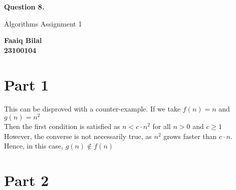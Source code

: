 \documentclass[]{article}
\begin{document}
\begin{center}
    \vspace*{1cm}

    \textbf{Question 8.}

    \vspace{0.5cm}
     Algorithms Assignment 1

    \vspace{0.15cm}

    \textbf{Faaiq Bilal} \\ 
    \textbf{23100104}
         
\end{center}

\section{Part 1}
This can be disproved with a counter-example. If we take $ f(n) = n$ and $ g(n) = n^2$ \\ 
Then the first condition is satisfied as $ n < c \cdot n^2 $ for all $n > 0 $ and $c \geq 1$  
\\ However, the converse is not necessarily true, as $n^2$ grows faster than $c \cdot n $.
\\
Hence, in this case, $g(n) \not\in f(n) $

\section{Part 2}
\end{document}
